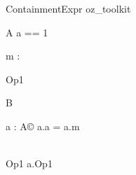 \begin{zsection}
  \SECTION ContainmentExpr \parents oz\_toolkit
\end{zsection}

\begin{class}{A}
  a == 1\\
  \begin{state}
    m : \nat
  \end{state}
  Op1 \sdef [x? : \nat]
\end{class}


\begin{class}{B}
  \begin{state}
   a : A\copyright
  \where
    a.a = a.m
  \end{state}\\
  Op1 \sdef a.Op1
\end{class}
